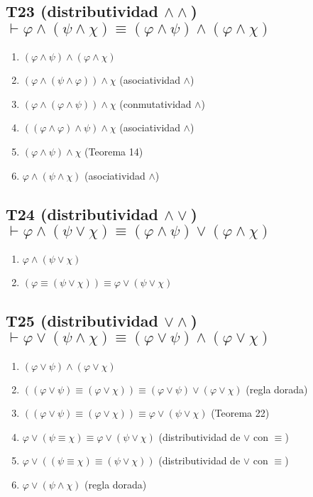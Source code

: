 \subsection{T23 (distributividad $\land\land$) $\vdash \varphi \land (\psi \land \chi) \equiv (\varphi \land \psi) \land (\varphi \land \chi)$}

\begin{enumerate}
    \item $(\varphi \land \psi) \land (\varphi \land \chi)$
    \item $(\varphi \land (\psi \land \varphi)) \land \chi$ \hfill (asociatividad $\land$)
    \item $(\varphi \land (\varphi \land \psi)) \land \chi$ \hfill (conmutatividad $\land$)
    \item $((\varphi \land \varphi) \land \psi) \land \chi$ \hfill (asociatividad $\land$)
    \item $(\varphi \land \psi) \land \chi$ \hfill (Teorema 14)
    \item $\varphi \land (\psi \land \chi)$ \hfill (asociatividad $\land$)
\end{enumerate}

\subsection{T24 (distributividad $\land\lor$) $\vdash \varphi \land (\psi \lor \chi) \equiv (\varphi \land \psi) \lor (\varphi \land \chi)$}

\begin{enumerate}
    \item $\varphi \land (\psi \lor \chi)$
    \item $(\varphi \equiv (\psi \lor \chi)) \equiv \varphi \lor (\psi \lor \chi)$
\end{enumerate}


\subsection{T25 (distributividad $\lor\land$) $\vdash \varphi \lor (\psi \land \chi) \equiv (\varphi \lor \psi) \land (\varphi \lor \chi)$}

\begin{enumerate}
    \item $(\varphi \lor \psi) \land (\varphi \lor \chi)$
    \item $((\varphi \lor \psi) \equiv (\varphi \lor \chi)) \equiv (\varphi \lor \psi) \lor (\varphi \lor \chi)$ \hfill (regla dorada)
    \item $((\varphi \lor \psi) \equiv (\varphi \lor \chi)) \equiv \varphi \lor (\psi \lor \chi)$ \hfill (Teorema 22)
    \item $\varphi \lor (\psi \equiv \chi) \equiv \varphi \lor (\psi \lor \chi)$ \hfill (distributividad de $\lor$ con $\equiv$)
    \item $\varphi \lor ((\psi \equiv \chi) \equiv (\psi \lor \chi))$ \hfill (distributividad de $\lor$ con $\equiv$)
    \item $\varphi \lor (\psi \land \chi)$ \hfill (regla dorada)
\end{enumerate}

